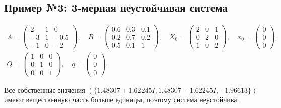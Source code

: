 \documentclass[10pt, a4paper]{article}
\begin{document}
\subsection{Пример №3: 3-мерная неустойчивая система}
\begin{gather*}
A =
\left(\begin{array}{ccc} 2 & 1 & 0\\ -3 & 1 & -0.5\\ -1 & 0 & -2 \end{array}\right),\quad
B =
\left(\begin{array}{ccc} 0.6 & 0.3 & 0.1\\ 0.2 & 0.7 & 0.2\\ 0.5 & 0.1 & 1 \end{array}\right),\quad
X_0 =
\left(\begin{array}{ccc} 2 & 0 & 1\\ 0 & 2 & 0\\ 1 & 0 & 2 \end{array}\right),\quad
x_0 =
\left(\begin{array}{c} 0\\ 0\\ 0 \end{array}\right),\quad \\
Q =
\left(\begin{array}{ccc} 1 & 0 & 0\\ 0 & 1 & 0\\ 0 & 0 & 1 \end{array}\right),\quad
q =
\left(\begin{array}{c} 0\\ 0\\ 0 \end{array}\right).
\end{gather*}

Все собственные значения $\left( \{1.48307 + 1.62245 I, 1.48307 - 1.62245 I, -1.96613\} \right)$ имеют вещественную часть больше единицы, поэтому система неустойчива.
\end{document}
